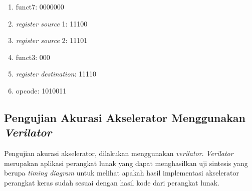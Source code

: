 \begin{enumerate}
	\item funct7: 0000000
	\item \textit{register source} 1: 11100
	\item \textit{register source} 2: 11101
	\item funct3: 000
	\item \textit{register destination}: 11110
	\item opcode: 1010011
\end{enumerate}

\subsection{Pengujian Akurasi Akselerator Menggunakan \textit{Verilator}}

Pengujian akurasi akselerator, dilakukan menggunakan \textit{verilator}. \textit{Verilator} \parencite{verilator2024github} merupakan aplikasi perangkat lunak yang dapat menghasilkan uji sintesis yang berupa \textit{timing diagram} untuk melihat apakah hasil implementasi akselerator perangkat keras sudah sesuai dengan hasil kode dari perangkat lunak.
